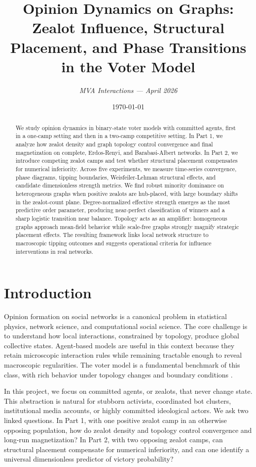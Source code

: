 \documentclass[12pt, a4paper]{article}
\title{Opinion Dynamics on Graphs: Zealot Influence, Structural Placement, and Phase Transitions in the Voter Model}
\author{\textit{MVA Interactions --- April 2026}}
\date{\today}
\begin{document}
\maketitle

\begin{abstract}
We study opinion dynamics in binary-state voter models with committed agents, first in a one-camp setting and then in a two-camp competitive setting. In Part 1, we analyze how zealot density and graph topology control convergence and final magnetization on complete, Erdos-Renyi, and Barabasi-Albert networks. In Part 2, we introduce competing zealot camps and test whether structural placement compensates for numerical inferiority. Across five experiments, we measure time-series convergence, phase diagrams, tipping boundaries, Weisfeiler-Lehman structural effects, and candidate dimensionless strength metrics. We find robust minority dominance on heterogeneous graphs when positive zealots are hub-placed, with large boundary shifts in the zealot-count plane. Degree-normalized effective strength emerges as the most predictive order parameter, producing near-perfect classification of winners and a sharp logistic transition near balance. Topology acts as an amplifier: homogeneous graphs approach mean-field behavior while scale-free graphs strongly magnify strategic placement effects. The resulting framework links local network structure to macroscopic tipping outcomes and suggests operational criteria for influence interventions in real networks.
\end{abstract}

\tableofcontents
\newpage

\section{Introduction}
Opinion formation on social networks is a canonical problem in statistical physics, network science, and computational social science. The core challenge is to understand how local interactions, constrained by topology, produce global collective states. Agent-based models are useful in this context because they retain microscopic interaction rules while remaining tractable enough to reveal macroscopic regularities. The voter model is a fundamental benchmark of this class, with rich behavior under topology changes and boundary conditions \cite{clifford1973,holley1975}.

In this project, we focus on committed agents, or zealots, that never change state. This abstraction is natural for stubborn activists, coordinated bot clusters, institutional media accounts, or highly committed ideological actors. We ask two linked questions. In Part 1, with one positive zealot camp in an otherwise opposing population, how do zealot density and topology control convergence and long-run magnetization? In Part 2, with two opposing zealot camps, can structural placement compensate for numerical inferiority, and can one identify a universal dimensionless predictor of victory probability?
\end{document}
